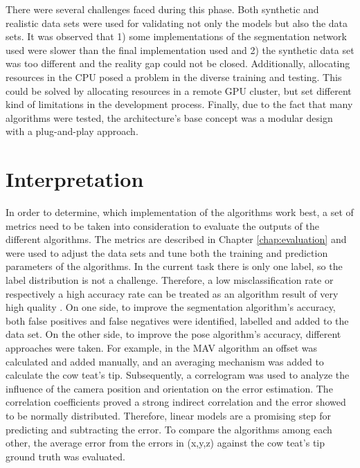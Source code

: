 There were several challenges faced during this phase. Both synthetic and realistic data sets were used for validating not only the models but also the data sets. It was observed that 1) some implementations of the segmentation network used were slower than the final implementation used and 2) the synthetic data set was too different and the reality gap could not be closed. Additionally, allocating resources in the CPU posed a problem in the diverse training and testing. This could be solved by allocating resources in a remote GPU cluster, but set different kind of limitations in the development process.  Finally, due to the fact that many algorithms were tested, the architecture's base concept was a modular design with a plug-and-play approach.

\section{Interpretation}\label{chap:3:interpretation}
In order to determine, which implementation of the algorithms work best, a set of metrics need to be taken into consideration to evaluate the outputs of the different algorithms. The metrics are described in Chapter \ref{chap:evaluation} and were used to adjust the data sets and tune both the training and prediction parameters of the algorithms. In the current task there is only one label, so the label distribution is not a challenge. Therefore, a low misclassification rate or respectively a high accuracy rate can be treated as an algorithm result of very high quality \cite{luckert2016using}. On one side, to improve the segmentation algorithm's accuracy, both false positives and false negatives were identified, labelled and added to the data set. On the other side, to improve the pose algorithm's accuracy, different approaches were taken. For example, in the MAV algorithm an offset was calculated and added manually, and an averaging mechanism was added to calculate the cow teat's tip. Subsequently, a correlogram was used to analyze the influence of the camera position and orientation on the error estimation. The correlation coefficients proved a strong indirect correlation and the error showed to be normally distributed. Therefore, linear models are a promising step for predicting and subtracting the error. 
To compare the algorithms among each other, the average error from the errors in (x,y,z) against the cow teat's tip ground truth was evaluated. 


